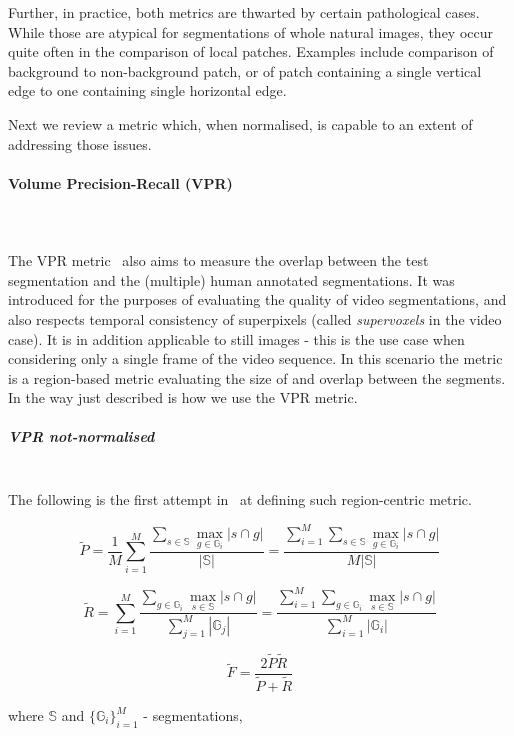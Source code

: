 Further, in practice, both metrics are thwarted by certain pathological cases. While those are atypical for segmentations of whole natural images, they occur quite often in the comparison of local patches. Examples include comparison of background to non-background patch, or of patch containing a single vertical edge to one containing single horizontal edge. 

Next we review a metric which, when normalised, is capable to an extent of addressing those issues.

\paragraph{Volume Precision-Recall (VPR)}\mbox{}\\\mbox{}\\
\label{par:ch4-VPR-maths}
The VPR metric~\cite{Galasso13} also aims to measure the overlap between the test segmentation and the (multiple) human annotated segmentations. It was introduced for the purposes of evaluating the quality of video segmentations, and also respects temporal consistency of superpixels (called \textit{supervoxels} in the video case). It is in addition applicable to %
still images - this is the use case when considering only a single frame of the video sequence. In this scenario the metric is a region-based metric evaluating the size of and overlap between the segments. 
In the way just described is how we use the VPR metric.

\subparagraph*{VPR not-normalised}\mbox{}\\
The following is the first attempt in~\cite{Galasso13} at defining such region-centric metric.

\[
\tilde{P}=\frac{1}{M}\sum\limits _{i=1}^{M}\frac{\sum\limits _{s\in\mathbb{S}}\max\limits _{g\in\mathbb{G}_{i}}\left|s\cap g\right|}{\left|\mathbb{S}\right|}=\frac{\sum\limits _{i=1}^{M}\sum\limits _{s\in\mathbb{S}}\max\limits _{g\in\mathbb{G}_{i}}\left|s\cap g\right|}{M\left|\mathbb{S}\right|}
\]

\[
\tilde{R}=\sum\limits _{i=1}^{M}\frac{\sum\limits _{g\in\mathbb{G}_{i}}\max\limits _{s\in\mathbb{S}}\left|s\cap g\right|}{\sum\limits _{j=1}^{M}\left|\mathbb{G}_{j}\right|}=\frac{\sum\limits _{i=1}^{M}\sum\limits _{g\in\mathbb{G}_{i}}\max\limits _{s\in\mathbb{S}}\left|s\cap g\right|}{\sum\limits _{i=1}^{M}\left|\mathbb{G}_{i}\right|}
\]


\[
\tilde{F}=\frac{2\tilde{P}\tilde{R}}{\tilde{P}+\tilde{R}}
\]

where $\mathbb{S}$ and $\{\mathbb{G}_{i}\}_{i=1}^{M}$ - segmentations,

